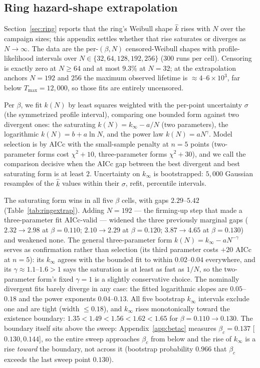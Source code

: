 \documentclass[pdflatex,sn-mathphys,Numbered]{sn-jnl}
\begin{document}
\begin{appendices}
\section{Ring hazard-shape extrapolation}\label{app:ring}

Section~\ref{sec:ring} reports that the ring's Weibull shape $\hat k$ rises with
$N$ over the campaign sizes; this appendix settles whether that rise saturates or
diverges as $N \to \infty$. The data are the per-$(\beta, N)$ censored-Weibull
shapes with profile-likelihood intervals over
$N \in \{32, 64, 128, 192, 256\}$ ($300$ runs per cell). Censoring is exactly
zero at $N \ge 64$ and at most $9.3\%$ at $N = 32$; at the extrapolation anchors
$N = 192$ and $256$ the maximum observed lifetime is
${\approx}4$--$6\times10^{3}$, far below $T_{\max} = 12{,}000$, so those fits are
entirely uncensored.

Per $\beta$, we fit $k(N)$ by least squares weighted with the per-point
uncertainty $\sigma$ (the symmetrized profile interval), comparing one bounded
form against two divergent ones: the saturating
$k(N) = k_\infty - a/N$ (two parameters), the logarithmic $k(N) = b + a \ln N$,
and the power law $k(N) = a N^{\gamma}$. Model selection is by AICc with the
small-sample penalty at $n = 5$ points (two-parameter forms cost
$\chi^2 + 10$, three-parameter forms $\chi^2 + 30$), and we call the comparison
decisive when the AICc gap between the best divergent and best saturating form
is at least $2$. Uncertainty on $k_\infty$ is bootstrapped: $5{,}000$ Gaussian
resamples of the $\hat k$ values within their $\sigma$, refit, percentile
intervals.

The saturating form wins in all five $\beta$ cells, with gaps $2.29$--$5.42$
(Table~\ref{tab:ringextrap}). Adding $N = 192$ --- the firming-up step that made
a three-parameter fit AICc-valid --- widened the three previously marginal gaps
($2.32 \to 2.98$ at $\beta = 0.110$; $2.10 \to 2.29$ at $\beta = 0.120$;
$3.87 \to 4.65$ at $\beta = 0.130$) and weakened none. The general
three-parameter form $k(N) = k_\infty - a N^{-\gamma}$ serves as confirmation
rather than selection (its third parameter costs $+20$ AICc at $n = 5$): its
$k_\infty$ agrees with the bounded fit to within $0.02$--$0.04$ everywhere, and
its $\gamma \approx 1.1$--$1.6 > 1$ says the saturation is at least as fast as
$1/N$, so the two-parameter form's fixed $\gamma = 1$ is a slightly conservative
choice. The nominally divergent fits barely diverge in any case: the fitted
logarithmic slopes are $0.05$--$0.18$ and the power exponents $0.04$--$0.13$.
All five bootstrap $k_\infty$ intervals exclude one and are tight (width
$\le 0.18$), and $k_\infty$ rises monotonically toward the existence boundary:
$1.35 < 1.49 < 1.56 < 1.62 < 1.65$ for $\beta = 0.110 \to 0.130$. The boundary
itself sits above the sweep: Appendix~\ref{app:betac} measures
$\beta_c = 0.137$ [$0.130, 0.144$], so the entire sweep approaches $\beta_c$
from below and the rise of $k_\infty$ is a rise \emph{toward} the boundary, not
across it (bootstrap probability $0.966$ that $\beta_c$ exceeds the last sweep
point $0.130$).


\end{appendices}
\end{document}
